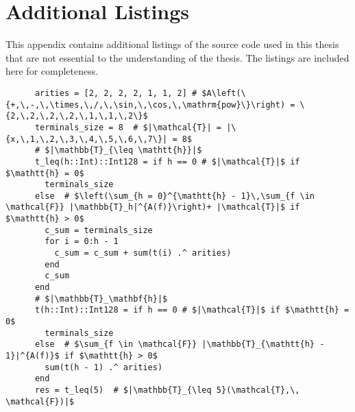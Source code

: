 \chapter{Additional Listings}
\label{app:Listings}
  This appendix contains additional listings of the source code used in this
  thesis that are not essential to the understanding of the thesis.
  The listings are included here for completeness.
  
  \begin{src}
    \label{lst:cardinality_of_T_leq_5}
    \begin{verbatim}
      arities = [2, 2, 2, 2, 1, 1, 2] # $A\left(\{+,\,-,\,\times,\,/,\,\sin,\,\cos,\,\mathrm{pow}\}\right) = \{2,\,2,\,2,\,2,\,1,\,1,\,2\}$
      terminals_size = 8  # $|\mathcal{T}| = |\{x,\,1,\,2,\,3,\,4,\,5,\,6,\,7\}| = 8$
      # $|\mathbb{T}_{\leq \mathtt{h}}|$
      t_leq(h::Int)::Int128 = if h == 0 # $|\mathcal{T}|$ if $\mathtt{h} = 0$
        terminals_size
      else  # $\left(\sum_{h = 0}^{\mathtt{h} - 1}\,\sum_{f \in \mathcal{F}} |\mathbb{T}_h|^{A(f)}\right)+ |\mathcal{T}|$ if $\mathtt{h} > 0$
        c_sum = terminals_size
        for i = 0:h - 1
          c_sum = c_sum + sum(t(i) .^ arities)
        end
        c_sum
      end
      # $|\mathbb{T}_\mathbf{h}|$
      t(h::Int)::Int128 = if h == 0 # $|\mathcal{T}|$ if $\mathtt{h} = 0$
        terminals_size
      else  # $\sum_{f \in \mathcal{F}} |\mathbb{T}_{\mathtt{h} - 1}|^{A(f)}$ if $\mathtt{h} > 0$
        sum(t(h - 1) .^ arities) 
      end
      res = t_leq(5)  # $|\mathbb{T}_{\leq 5}(\mathcal{T},\, \mathcal{F})|$
    \end{verbatim}
  \end{src}
